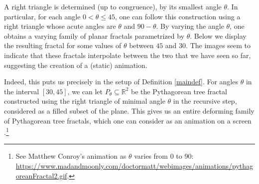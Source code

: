 \documentclass[12 pt]{article}
\newcommand{\bR}{\mathbb{R}}
\begin{document}
\begin{center}
\end{center}
A right triangle is determined (up to congruence), by its smallest angle $\theta$.  In particular, for each angle $0<\theta\le45$, one can follow this construction using a right triangle whose acute angles are $\theta$ and $90-\theta$.  By varying the angle $\theta$, one obtains a varying family of planar fractals parametrized by $\theta$.  Below we display the resulting fractal for some values of $\theta$ between $45$ and $30$.  The images seem to indicate that these fractals interpolate between the two that we have seen so far, suggesting the creation of a (static) animation.
\begin{center}
\end{center}
Indeed, this puts us precisely in the setup of Definition \ref{maindef}.  For angles $\theta$ in the interval $[30,45]$, we can let $P_\theta\subseteq\bR^2$ be the Pythagorean tree fractal constructed using the right triangle of minimal angle $\theta$ in the recursive step, considered as a filled subset of the plane.  This gives us an entire deforming family of Pythagorean tree fractals, which one can consider as an animation on a screen \cite{Conroy}.\footnote{See Matthew Conroy's animation as $\theta$ varies from 0 to 90: \url{https://www.madandmoonly.com/doctormatt/webimages/animations/pythagoreanFractal2.gif}.}\\
\end{document}
